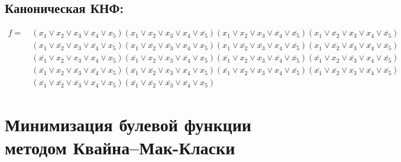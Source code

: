 \documentclass{article}
\begin{document}
\subsection*{Каноническая КНФ:}
\begin{align*}
f =\: &\left(x_{1} \lor x_{2} \lor x_{3} \lor x_{4} \lor x_{5}\right)\left(x_{1} \lor x_{2} \lor x_{3} \lor x_{4} \lor \overline{x_{5}}\right)\left(x_{1} \lor x_{2} \lor x_{3} \lor \overline{x_{4}} \lor \overline{x_{5}}\right)\left(x_{1} \lor \overline{x_{2}} \lor x_{3} \lor x_{4} \lor \overline{x_{5}}\right)\\&\left(x_{1} \lor \overline{x_{2}} \lor x_{3} \lor \overline{x_{4}} \lor x_{5}\right)\left(x_{1} \lor \overline{x_{2}} \lor \overline{x_{3}} \lor x_{4} \lor x_{5}\right)\left(x_{1} \lor \overline{x_{2}} \lor \overline{x_{3}} \lor x_{4} \lor \overline{x_{5}}\right)\left(x_{1} \lor \overline{x_{2}} \lor \overline{x_{3}} \lor \overline{x_{4}} \lor \overline{x_{5}}\right)\\&\left(\overline{x_{1}} \lor x_{2} \lor x_{3} \lor x_{4} \lor x_{5}\right)\left(\overline{x_{1}} \lor x_{2} \lor x_{3} \lor \overline{x_{4}} \lor x_{5}\right)\left(\overline{x_{1}} \lor x_{2} \lor x_{3} \lor \overline{x_{4}} \lor \overline{x_{5}}\right)\left(\overline{x_{1}} \lor x_{2} \lor \overline{x_{3}} \lor x_{4} \lor \overline{x_{5}}\right)\\&\left(\overline{x_{1}} \lor x_{2} \lor \overline{x_{3}} \lor \overline{x_{4}} \lor x_{5}\right)\left(\overline{x_{1}} \lor \overline{x_{2}} \lor x_{3} \lor x_{4} \lor x_{5}\right)\left(\overline{x_{1}} \lor \overline{x_{2}} \lor x_{3} \lor x_{4} \lor \overline{x_{5}}\right)\left(\overline{x_{1}} \lor \overline{x_{2}} \lor x_{3} \lor \overline{x_{4}} \lor \overline{x_{5}}\right)\\&\left(\overline{x_{1}} \lor \overline{x_{2}} \lor \overline{x_{3}} \lor x_{4} \lor x_{5}\right)\left(\overline{x_{1}} \lor \overline{x_{2}} \lor \overline{x_{3}} \lor \overline{x_{4}} \lor x_{5}\right)\end{align*}
\section*{Минимизация булевой функции методом Квайна--Мак-Класки}
\end{document}
